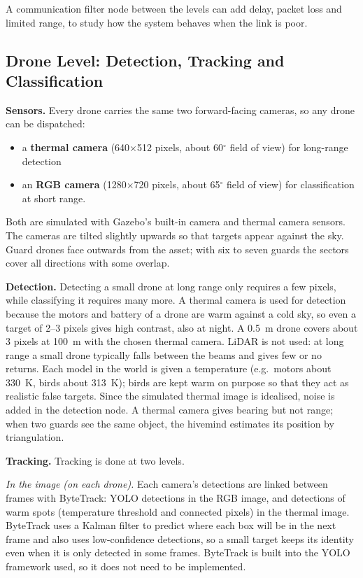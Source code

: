 \documentclass{article}
\begin{document}
A communication filter node between the levels can add delay, packet loss
and limited range, to study how the system behaves when the link is poor.

\subsection{Drone Level: Detection, Tracking and Classification}
\textbf{Sensors.} Every drone carries the same two forward-facing
cameras, so any drone can be dispatched:
\begin{itemize}
    \item a \textbf{thermal camera} (640$\times$512 pixels, about
          60$^\circ$ field of view) for long-range detection
    \item an \textbf{RGB camera} (1280$\times$720 pixels, about
          65$^\circ$ field of view) for classification at short range.
\end{itemize}
Both are simulated with Gazebo's built-in camera and thermal camera
sensors. The cameras are tilted slightly upwards so that targets appear
against the sky. Guard drones face outwards from the asset; with six to
seven guards the sectors cover all directions with some overlap.

\textbf{Detection.} Detecting a small drone at long range only requires a
few pixels, while classifying it requires many more. A thermal camera is
used for detection because the motors and battery of a drone are warm
against a cold sky, so even a target of 2--3 pixels gives high contrast,
also at night. A 0.5~m drone covers about 3 pixels at 100~m with the
chosen thermal camera. LiDAR is not used: at long range a small drone
typically falls between the beams and gives few or no returns. Each model
in the world is given a temperature (e.g.\ motors about 330~K, birds about
313~K); birds are kept warm on purpose so that they act as realistic false
targets. Since the simulated thermal image is idealised, noise is added in
the detection node. A thermal camera gives bearing but not range; when two
guards see the same object, the hivemind estimates its position by
triangulation.

\textbf{Tracking.} Tracking is done at two levels.

\emph{In the image (on each drone).} Each camera's detections are linked
between frames with ByteTrack: YOLO detections in the RGB image, and
detections of warm spots (temperature threshold and connected pixels) in
the thermal image. ByteTrack uses a Kalman filter to predict where each box
will be in the next frame and also uses low-confidence detections, so a
small target keeps its identity even when it is only detected in some
frames. ByteTrack is built into the YOLO framework used, so it does not
need to be implemented.
\end{document}
